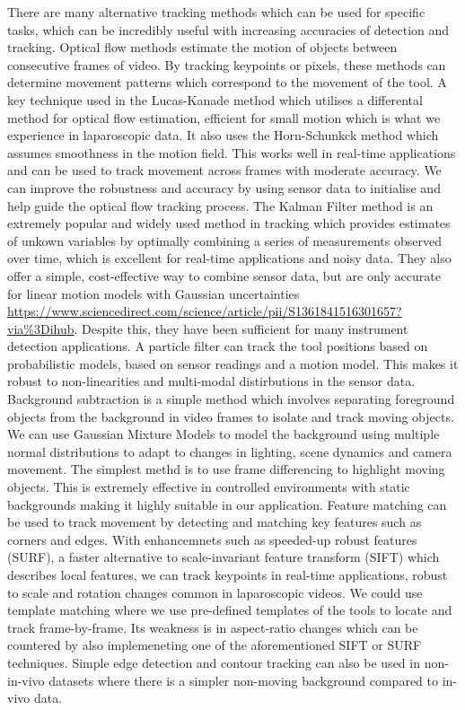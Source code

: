 \begin{multicols}{2}
There are many alternative tracking methods which can be used for specific tasks, which can be incredibly useful with increasing accuracies of detection and tracking. Optical flow methods estimate the motion of objects between consecutive frames of video. By tracking keypoints or pixels, these methods can determine movement patterns which correspond to the movement of the tool. A key technique used in the Lucas-Kanade method which utilises a differental method for optical flow estimation, efficient for small motion which is what we experience in laparoscopic data. It also uses the Horn-Schunkck method which assumes smoothness in the motion field. This works well in real-time applications and can be used to track movement across frames with moderate accuracy. We can improve the robustness and accuracy by using sensor data to initialise and help guide the optical flow tracking process. The Kalman Filter method is an extremely popular and widely used method in tracking which provides estimates of unkown variables by optimally combining a series of measurements observed over time, which is excellent for real-time applications and noisy data. They also offer a simple, cost-effective way to combine sensor data, but are only accurate for linear motion models with Gaussian uncertainties \url{https://www.sciencedirect.com/science/article/pii/S1361841516301657?via%3Dihub}. Despite this, they have been sufficient for many instrument detection applications. A particle filter can track the tool positions based on probabilistic models, based on sensor readings and a motion model. This makes it robust to non-linearities and multi-modal distirbutions in the sensor data. Background subtraction is a simple method which involves separating foreground objects from the background in video frames to isolate and track moving objects. We can use Gaussian Mixture Models to model the background using multiple normal distributions to adapt to changes in lighting, scene dynamics and camera movement. The simplest methd is to use frame differencing to highlight moving objects. This is extremely effective in controlled environments with static backgrounds making it highly suitable in our application. Feature matching can be used to track movement by detecting and matching key features such as corners and edges. With enhancemnets such as speeded-up robust features (SURF), a faster alternative to scale-invariant feature transform (SIFT) which describes local features, we can track keypoints in real-time applications, robust to scale and rotation changes common in laparoscopic videos. We could use template matching where we use pre-defined templates of the tools to locate and track frame-by-frame. Its weakness is in aspect-ratio changes which can be countered by also implemeneting one of the aforementioned SIFT or SURF techniques. Simple edge detection and contour tracking can also be used in non-in-vivo datasets where there is a simpler non-moving background compared to in-vivo data.


\end{multicols}
